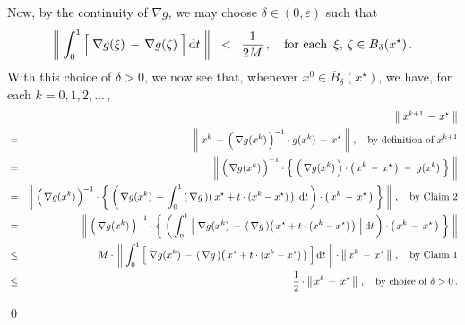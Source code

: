 \begin{enumerate}
	\vskip 0.3cm
	\noindent
	Now, by the continuity of $\nabla g$, we may choose $\delta \in (0,\varepsilon)$ such that
	\begin{equation*}
		\left\Vert\;
			\int_{0}^{1}
			\left[\;
				\overset{{\color{white}.}}{\nabla} g(\xi) \,-\, \nabla g(\zeta)
			\;\right]
			\d t
		\;\right\Vert
		\;\; < \;\; \dfrac{1}{2M}\,,
		\quad
		\textnormal{for each \,$\xi, \, \zeta \in \overline{B}_{\delta}(x^{\star})$}\,.
	\end{equation*}
	With this choice of $\delta > 0$, we now see that,
	whenever $x^{0} \in \overline{B}_{\delta}(x^{\star})$, we have, for each $k = 0, 1, 2, \ldots$\,,
	\begin{eqnarray*}
	&&
		\left\Vert\;x^{k+1} \,-\, x^{\star}\;\right\Vert
	\\
	&\overset{{\color{white}\textnormal{\Large 1}}}{=}&
		\left\Vert\;x^{k} \,-\, \left(\,\overset{{\color{white}.}}{\nabla} g(x^{k})\,\right)^{-1}\cdot g(x^{k}) \,-\, x^{\star}\;\right\Vert\,,
		\quad
		\textnormal{by definition of $x^{k+1}$}
	\\
	&=&
		\left\Vert\;
			\left(\,\overset{{\color{white}.}}{\nabla} g(x^{k})\,\right)^{-1}
			\cdot
			\left\{\;
				\left(\,\overset{{\color{white}.}}{\nabla} g(x^{k})\,\right)\cdot\left(\,x^{k} \,-\, x^{\star}\,\right)
				\;-\; g(x^{k}) 
			\;\right\}
		\;\right\Vert
	\\
	&=&
		\left\Vert\;
			\left(\,\overset{{\color{white}.}}{\nabla} g(x^{k})\,\right)^{-1}
			\cdot
			\left\{\;
				\left(\,
					\overset{{\color{white}.}}{\nabla} g(x^{k})
					\,-\,
					\int_{0}^{1}
					\left(\,\nabla g\,\right)\!\left(\,x^{\star} + t\cdot(x^{k}-x^{\star})\,\right) 
					\;\d t
				\,\right)
				\cdot\left(\,x^{k} \,-\, x^{\star}\,\right)
			\;\right\}
		\;\right\Vert\,,
		\quad
		\textnormal{by Claim 2}
	\\
	&=&
		\left\Vert\;
			\left(\,\overset{{\color{white}.}}{\nabla} g(x^{k})\,\right)^{-1}
			\cdot
			\left\{\;
				\left(\,
					\int_{0}^{1}
					\left[\;
						\overset{{\color{white}.}}{\nabla} g(x^{k})
						\,-\,
						\left(\,\nabla g\,\right)\!\left(\,x^{\star} + t\cdot(x^{k}-x^{\star})\,\right)
					\;\right]
					\d t
				\,\right)
				\cdot\left(\,x^{k} \,-\, x^{\star}\,\right)
			\;\right\}
		\;\right\Vert
	\\
	&\leq&
		M \cdot\,
		\left\Vert\;
			\int_{0}^{1}
			\left[\;
				\overset{{\color{white}.}}{\nabla} g(x^{k})
				\,-\,
				\left(\,\nabla g\,\right)\!\left(\,x^{\star} + t\cdot(x^{k}-x^{\star})\,\right)
			\;\right]
			\d t
		\;\right\Vert
		\cdot
		\left\Vert\,x^{k} \,-\, x^{\star}\,\right\Vert\,,
		\quad
		\textnormal{by Claim 1}
	\\
	&\leq&
		\dfrac{1}{2} \cdot \left\Vert\,x^{k} \,-\, x^{\star}\,\right\Vert\,,
		\quad
		\textnormal{by choice of $\delta > 0$}\,.
	\end{eqnarray*}
\end{enumerate}
\qed

